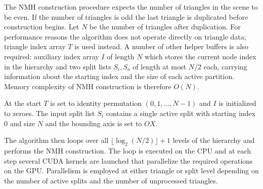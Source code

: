 The NMH construction procedure expects the number of triangles in the scene to be even. If the number of triangles is odd the last triangle is duplicated before construction begins. Let $N$ be the number of triangles after duplication. For performance reasons the algorithm does not operate directly on triangle data; triangle index array $T$ is used instead. A number of other helper buffers is also required: auxiliary index array $I$ of length $N$ which stores the current node index in the hierarchy and two split lists $S_{i}, S_{o}$ of length at most $N/2$ each, carrying information about the starting index and the size of each active partition. Memory complexity of NMH construction is therefore $O(N)$.

At the start $T$ is set to identity permutation $(0, 1, \dots, N-1)$ and $I$ is initialized to zeroes. The input split list $S_{i}$ contains a single active split with starting index $0$ and size $N$ and the bounding axis is set to $OX$.

The algorithm then loops over all $\lfloor \log_{2}(N/2) \rfloor + 1$ levels of the hierarchy and performs the NMH construction. The loop is executed on the CPU and at each step several CUDA kernels are launched that parallelize the required operations on the GPU. Parallelism is employed at either triangle or split level depending on the number of active splits and the number of unprocessed triangles.

